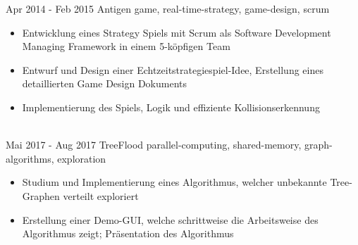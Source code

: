 \documentclass[letterpaper]{twentysecondcv_german} %
\begin{document}
\begin{twenty}
	\twentyitem
    		{Apr 2014 -}
		{Feb 2015}
        		{Antigen}
        		{}
        		{game, real-time-strategy, game-design, scrum}
        		{\begin{itemize}
	        		\item Entwicklung eines Strategy Spiels mit Scrum als Software Development Managing Framework in einem 5-köpfigen Team
        			\item Entwurf und Design einer Echtzeitstrategiespiel-Idee, Erstellung eines detaillierten Game Design Dokuments
        			\item Implementierung des Spiels, Logik und effiziente Kollisionserkennung
        		\end{itemize}}\\
	\twentyitem
    		{Mai 2017 -}
		{Aug 2017}
        		{TreeFlood}
        		{}
        		{parallel-computing, shared-memory, graph-algorithms, exploration}
        		{\begin{itemize}
        			\item Studium und Implementierung eines Algorithmus, welcher unbekannte Tree-Graphen verteilt exploriert
        			\item Erstellung einer Demo-GUI, welche schrittweise die Arbeitsweise des Algorithmus zeigt; Präsentation des Algorithmus
        		\end{itemize}}\\
\end{twenty}
\end{document}
